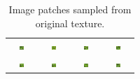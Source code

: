 \documentclass[letter]{article}
\begin{document}
\begin{table}[h!]
\begin{tabular}{cccc}
		\includegraphics[width=0.17\textwidth]{../data/ivy2/512/17} &
		\includegraphics[width=0.17\textwidth]{../data/ivy2/512/18} &
		\includegraphics[width=0.17\textwidth]{../data/ivy2/512/19} &
		\includegraphics[width=0.17\textwidth]{../data/ivy2/512/20} \tabularnewline
		\includegraphics[width=0.17\textwidth]{../data/ivy2/512/21} &
		\includegraphics[width=0.17\textwidth]{../data/ivy2/512/21} &
		\includegraphics[width=0.17\textwidth]{../data/ivy2/512/22} &
		\includegraphics[width=0.17\textwidth]{../data/ivy2/512/23} \tabularnewline
	\end{tabular}
	\caption{Image patches sampled from original texture.}
\end{table}
\end{document}
